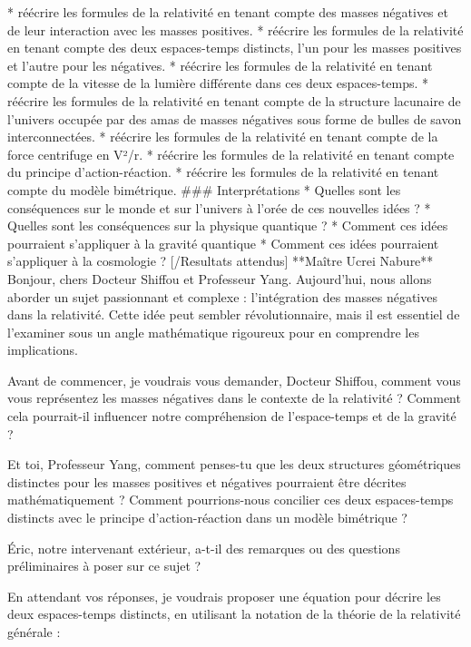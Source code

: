         * réécrire les formules de la relativité en tenant compte des masses négatives et de leur interaction avec les masses positives.
        * réécrire les formules de la relativité en tenant compte des deux espaces-temps distincts, l'un pour les masses positives et l'autre pour les négatives.
        * réécrire les formules de la relativité en tenant compte de la vitesse de la lumière différente dans ces deux espaces-temps.
        * réécrire les formules de la relativité en tenant compte de la structure lacunaire de l'univers occupée par des amas de masses négatives sous forme de bulles de savon interconnectées.
        * réécrire les formules de la relativité en tenant compte de la force centrifuge en V²/r.
        * réécrire les formules de la relativité en tenant compte du principe d'action-réaction.
        * réécrire les formules de la relativité en tenant compte du modèle bimétrique.
        ### Interprétations
        * Quelles sont les conséquences sur le monde et sur l'univers à l'orée de ces nouvelles idées ?
        * Quelles sont les conséquences sur la physique quantique ?
        * Comment ces idées pourraient s'appliquer à la gravité quantique
        * Comment ces idées pourraient s'appliquer à la cosmologie ?
        [/Resultats attendus]
**Maître Ucrei Nabure**
Bonjour, chers Docteur Shiffou et Professeur Yang. Aujourd'hui, nous allons aborder un sujet passionnant et complexe : l'intégration des masses négatives dans la relativité. Cette idée peut sembler révolutionnaire, mais il est essentiel de l'examiner sous un angle mathématique rigoureux pour en comprendre les implications.

Avant de commencer, je voudrais vous demander, Docteur Shiffou, comment vous vous représentez les masses négatives dans le contexte de la relativité ? Comment cela pourrait-il influencer notre compréhension de l'espace-temps et de la gravité ?

Et toi, Professeur Yang, comment penses-tu que les deux structures géométriques distinctes pour les masses positives et négatives pourraient être décrites mathématiquement ? Comment pourrions-nous concilier ces deux espaces-temps distincts avec le principe d'action-réaction dans un modèle bimétrique ?

Éric, notre intervenant extérieur, a-t-il des remarques ou des questions préliminaires à poser sur ce sujet ?

En attendant vos réponses, je voudrais proposer une équation pour décrire les deux espaces-temps distincts, en utilisant la notation de la théorie de la relativité générale :

